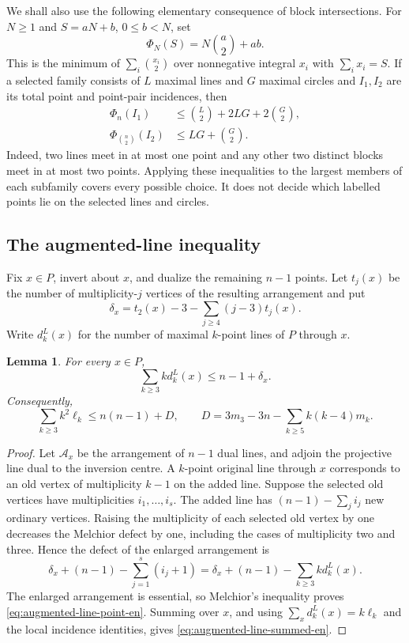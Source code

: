 \documentclass[11pt,a4paper]{article}
\newtheorem{lemma}[theorem]{Lemma}
\theoremstyle{definition}
\begin{document}
We shall also use the following elementary consequence of block intersections.
For $N\ge1$ and $S=aN+b$, $0\le b<N$, set
\[
 \Phi_N(S)=N\binom a2+ab.
\]
This is the minimum of $\sum_i\binom{x_i}{2}$ over nonnegative integral
$x_i$ with $\sum_i x_i=S$.  If a selected family consists of $L$ maximal
lines and $G$ maximal circles and $I_1,I_2$ are its total point and point-pair
incidences, then
\begin{align}
 \Phi_n(I_1)&\le \binom L2+2LG+2\binom G2,
 \label{eq:small-block-point-en}\\
 \Phi_{\binom n2}(I_2)&\le LG+\binom G2.
 \label{eq:small-block-pair-en}
\end{align}
Indeed, two lines meet in at most one point and any other two distinct blocks
meet in at most two points.  Applying these inequalities to the largest
members of each subfamily covers every possible choice.  It does not decide
which labelled points lie on the selected lines and circles.

\subsection{The augmented-line inequality}

Fix $x\in P$, invert about $x$, and dualize the remaining $n-1$ points.  Let
$t_j(x)$ be the number of multiplicity-$j$ vertices of the resulting
arrangement and put
\[
 \delta_x=t_2(x)-3-\sum_{j\ge4}(j-3)t_j(x).
\]
Write $d_k^L(x)$ for the number of maximal $k$-point lines of $P$ through
$x$.

\begin{lemma}\label{lem:augmented-line-en}
For every $x\in P$,
\begin{equation}\label{eq:augmented-line-point-en}
 \sum_{k\ge3}k d_k^L(x)\le n-1+\delta_x.
\end{equation}
Consequently,
\begin{equation}\label{eq:augmented-line-summed-en}
 \sum_{k\ge3}k^2\ell_k\le n(n-1)+D,
 \qquad
 D=3m_3-3n-\sum_{k\ge5}k(k-4)m_k.
\end{equation}
\end{lemma}

\begin{proof}
Let $\mathcal A_x$ be the arrangement of $n-1$ dual lines, and adjoin the
projective line dual to the inversion centre.  A $k$-point original line
through $x$ corresponds to an old vertex of multiplicity $k-1$ on the added
line.  Suppose the selected old vertices have multiplicities $i_1,\ldots,i_s$.
The added line has
$(n-1)-\sum_j i_j$ new ordinary vertices.  Raising the multiplicity of each
selected old vertex by one decreases the Melchior defect by one, including
the cases of multiplicity two and three.  Hence the defect of the enlarged
arrangement is
\[
 \delta_x+(n-1)-\sum_{j=1}^s(i_j+1)
 =\delta_x+(n-1)-\sum_{k\ge3}k d_k^L(x).
\]
The enlarged arrangement is essential, so Melchior's inequality proves
\eqref{eq:augmented-line-point-en}.  Summing over $x$, and using
$\sum_xd_k^L(x)=k\ell_k$ and the local incidence identities, gives
\eqref{eq:augmented-line-summed-en}.
\end{proof}
\end{document}
